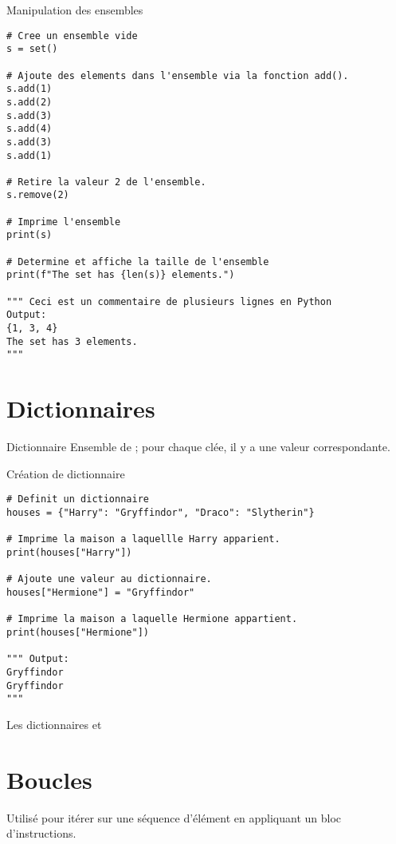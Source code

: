 \documentclass{report}
\begin{document}
\begin{EExample*}{Manipulation des ensembles}{}
\begin{lstlisting}[style=PythonDraculaWhite]
# Cree un ensemble vide
s = set()

# Ajoute des elements dans l'ensemble via la fonction add().
s.add(1)
s.add(2)
s.add(3)
s.add(4)
s.add(3)
s.add(1)

# Retire la valeur 2 de l'ensemble.
s.remove(2)

# Imprime l'ensemble
print(s)

# Determine et affiche la taille de l'ensemble
print(f"The set has {len(s)} elements.")

""" Ceci est un commentaire de plusieurs lignes en Python
Output:
{1, 3, 4}
The set has 3 elements.
"""
\end{lstlisting}
\end{EExample*}


\section{Dictionnaires}
\begin{DefG*}{Dictionnaire}{}
Ensemble de  ; pour chaque clée, il y a une valeur correspondante. 
\end{DefG*}
\begin{codeEx*}{Création de dictionnaire}{}
\begin{lstlisting}[style=PythonDraculaWhite]
# Definit un dictionnaire
houses = {"Harry": "Gryffindor", "Draco": "Slytherin"}

# Imprime la maison a laquellle Harry apparient. 
print(houses["Harry"])

# Ajoute une valeur au dictionnaire. 
houses["Hermione"] = "Gryffindor"

# Imprime la maison a laquelle Hermione appartient.  
print(houses["Hermione"])

""" Output:
Gryffindor
Gryffindor
"""
\end{lstlisting}
\end{codeEx*}
\begin{note}
Les dictionnaires  et 
\end{note}


\section{Boucles}
\begin{DefG*}{}{}
Utilisé pour itérer sur une séquence d'élément en appliquant un bloc d'instructions. 
\end{DefG*}
\end{document}
